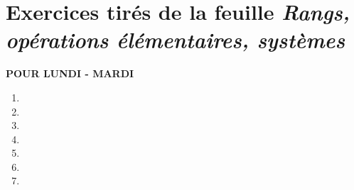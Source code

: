 

\section*{Exercices tirés de la feuille \emph{Rangs, opérations élémentaires, systèmes}}
\begin{huge}  \textbf{POUR LUNDI - MARDI}   \end{huge}
\begin{enumerate}
  \item  
  \item 
  \item 
  \item 
  \item 
  \item 
  \item 
\end{enumerate}


